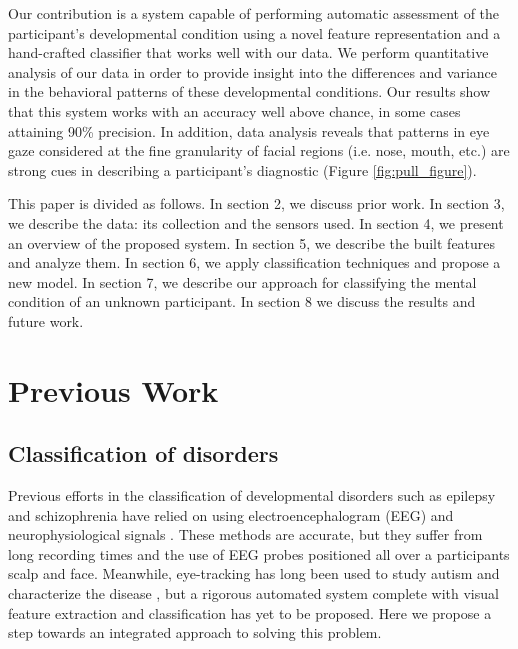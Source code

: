 \documentclass[10pt,twocolumn,letterpaper]{article}
\begin{document}
Our contribution is a system capable of performing automatic assessment of the participant's developmental condition using a novel feature representation and a hand-crafted classifier that works well with our data. We perform quantitative analysis of our data in order to provide insight into the differences and variance in the behavioral patterns of these developmental conditions. Our results show that this system works with an accuracy well above chance, in some cases attaining 90\% precision. In addition, data analysis reveals that patterns in eye gaze considered at the fine granularity of facial regions (i.e. nose, mouth, etc.) are strong cues in describing a participant's diagnostic (Figure \ref{fig:pull_figure}). 

This paper is divided as follows. In section 2, we discuss prior work. In section 3, we describe the data: its collection and the sensors used. In section 4, we present an overview of the proposed system. In section 5, we describe the built features and analyze them. In section 6, we apply classification techniques and propose a new model. In section 7, we describe our approach for classifying the mental condition of an unknown participant. In section 8 we discuss the results and future work.

\section {Previous Work}

\subsection{Classification of disorders} Previous efforts in the classification of developmental disorders such as epilepsy and schizophrenia have relied on using electroencephalogram (EEG) and neurophysiological signals \cite{Kumar, sabeti}. These methods are accurate, but they suffer from long recording times and the use of EEG probes positioned all over a participants scalp and face. Meanwhile, eye-tracking has long been used to study autism and characterize the disease \cite{Boraston, hashemi, dalton}, but a rigorous automated system complete with visual feature extraction and classification has yet to be proposed. Here we propose a step towards an integrated approach to solving this problem. 
\end{document}
